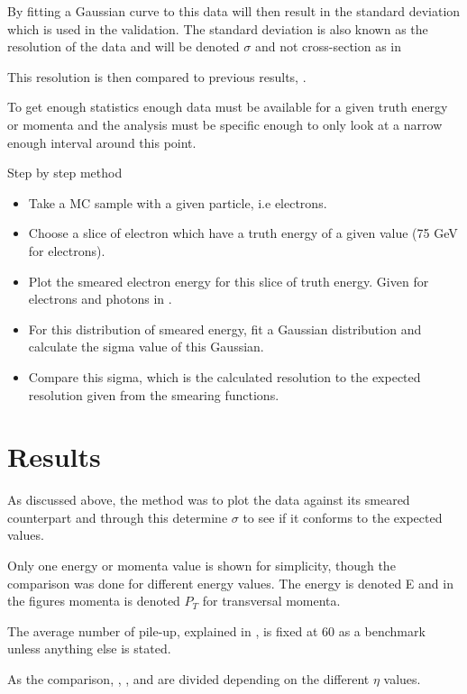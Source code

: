 By fitting a Gaussian curve to this data will then result in the standard deviation which is used in the validation. The standard deviation is also known as the resolution of the data and will be denoted $\sigma$ and not cross-section as in 

This resolution is then compared to previous results, \citep{ATL-PHYS-PUB-2013-004}.

To get enough statistics enough data must be available for a given truth energy or momenta and the analysis must be specific enough to only look at a narrow enough interval around this point.

Step by step method
\begin{itemize}
\item Take a MC sample with a given particle, i.e electrons.
\item Choose a slice of electron which have a truth energy of a given value (75 GeV for electrons).
\item Plot the smeared electron energy for this slice of truth energy. Given for electrons and photons in .
\item For this distribution of smeared energy, fit a Gaussian distribution and calculate the sigma value of this Gaussian.
\item Compare this sigma, which is the calculated resolution to the expected resolution given from the smearing functions.
\end{itemize}

\newpage
\section{Results}\label{cha:vali:sec:results}
As discussed above, the method was to plot the data against its smeared counterpart and through this determine $\sigma$ to see if it conforms to the expected values.

Only one energy or momenta value is shown for simplicity, though the comparison was done for different energy values. The energy is denoted E and in the figures momenta is denoted $P_T$ for transversal momenta.

The average number of pile-up, explained in , is fixed at 60 as a benchmark unless anything else is stated.

As the comparison, , ,  and  are divided depending on the different $\eta$ values.

